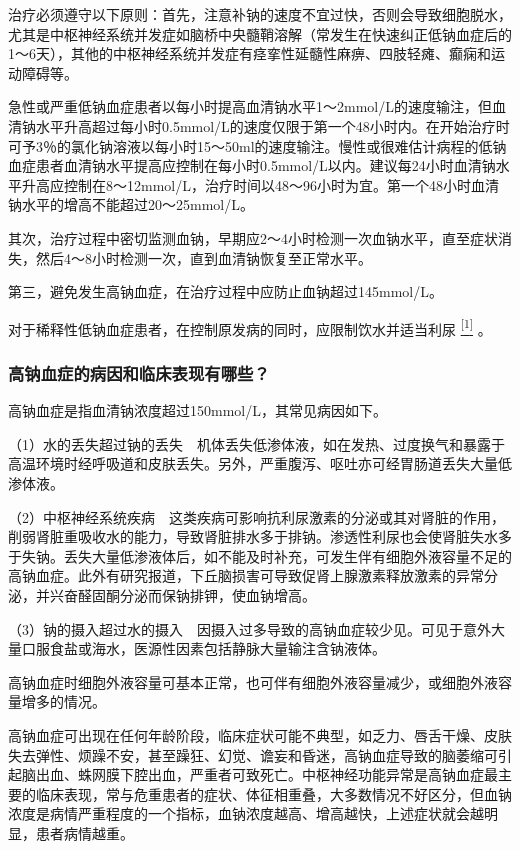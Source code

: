 治疗必须遵守以下原则：首先，注意补钠的速度不宜过快，否则会导致细胞脱水，尤其是中枢神经系统并发症如脑桥中央髓鞘溶解（常发生在快速纠正低钠血症后的1～6天），其他的中枢神经系统并发症有痉挛性延髓性麻痹、四肢轻瘫、癫痫和运动障碍等。

急性或严重低钠血症患者以每小时提高血清钠水平1～2mmol/L的速度输注，但血清钠水平升高超过每小时0.5mmol/L的速度仅限于第一个48小时内。在开始治疗时可予3％的氯化钠溶液以每小时15～50ml的速度输注。慢性或很难估计病程的低钠血症患者血清钠水平提高应控制在每小时0.5mmol/L以内。建议每24小时血清钠水平升高应控制在8～12mmol/L，治疗时间以48～96小时为宜。第一个48小时血清钠水平的增高不能超过20～25mmol/L。

其次，治疗过程中密切监测血钠，早期应2～4小时检测一次血钠水平，直至症状消失，然后4～8小时检测一次，直到血清钠恢复至正常水平。

第三，避免发生高钠血症，在治疗过程中应防止血钠超过145mmol/L。

对于稀释性低钠血症患者，在控制原发病的同时，应限制饮水并适当利尿
\protect\hyperlink{text00025.htmlux5cux23ch1-24}{\textsuperscript{{[}1{]}}}
。

\subsubsection{高钠血症的病因和临床表现有哪些？}

高钠血症是指血清钠浓度超过150mmol/L，其常见病因如下。

（1）水的丢失超过钠的丢失　机体丢失低渗体液，如在发热、过度换气和暴露于高温环境时经呼吸道和皮肤丢失。另外，严重腹泻、呕吐亦可经胃肠道丢失大量低渗体液。

（2）中枢神经系统疾病　这类疾病可影响抗利尿激素的分泌或其对肾脏的作用，削弱肾脏重吸收水的能力，导致肾脏排水多于排钠。渗透性利尿也会使肾脏失水多于失钠。丢失大量低渗液体后，如不能及时补充，可发生伴有细胞外液容量不足的高钠血症。此外有研究报道，下丘脑损害可导致促肾上腺激素释放激素的异常分泌，并兴奋醛固酮分泌而保钠排钾，使血钠增高。

（3）钠的摄入超过水的摄入　因摄入过多导致的高钠血症较少见。可见于意外大量口服食盐或海水，医源性因素包括静脉大量输注含钠液体。

高钠血症时细胞外液容量可基本正常，也可伴有细胞外液容量减少，或细胞外液容量增多的情况。

高钠血症可出现在任何年龄阶段，临床症状可能不典型，如乏力、唇舌干燥、皮肤失去弹性、烦躁不安，甚至躁狂、幻觉、谵妄和昏迷，高钠血症导致的脑萎缩可引起脑出血、蛛网膜下腔出血，严重者可致死亡。中枢神经功能异常是高钠血症最主要的临床表现，常与危重患者的症状、体征相重叠，大多数情况不好区分，但血钠浓度是病情严重程度的一个指标，血钠浓度越高、增高越快，上述症状就会越明显，患者病情越重。

